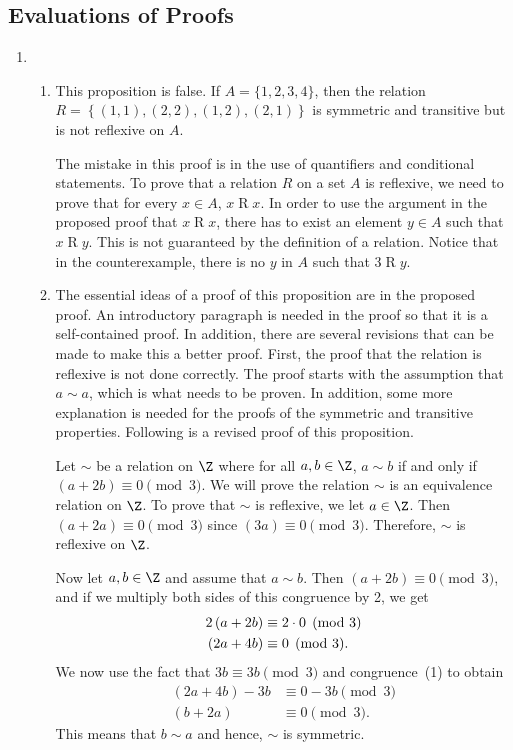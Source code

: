 \subsection*{Evaluations of Proofs}
\setcounter{oldenumi}{\theenumi}
\begin{enumerate} \setcounter{enumi}{\theoldenumi}
\item \begin{enumerate}
\item This proposition is false.  If $A = \{1, 2, 3, 4 \}$, then the relation  
$R  = \left\{ {\left( {1, 1} \right), \left( {2, 2} \right), \left( {1, 2} \right), \left( {2, 1} \right)} \right\}$ is symmetric and transitive but is not reflexive on  
$A$.

\noindent
The mistake in this proof is in the use of quantifiers and conditional statements.  To prove that a relation $R$ on a set $A$ is reflexive, we need to prove that for every $x \in A$, 
$x \mathrel{R} x$.  In order to use the argument in the proposed proof that $x \mathrel{R} x$, there has to exist an element $y \in A$ such that $x \mathrel{R} y$.  This is not guaranteed by the definition of a relation.  Notice that in the counterexample, there is no $y$ in $A$ such that $3 \mathrel{R} y$.

\item The essential ideas of a proof of this proposition are in the proposed proof.  An introductory paragraph is needed in the proof so that it is a self-contained proof.  In addition, there are several revisions that can be made to make this a better proof.  First, the proof that the relation is reflexive is not done correctly.  The proof starts with the assumption that $a \sim a$, which is what needs to be proven.  In addition, some more explanation is needed for the proofs of the symmetric and transitive properties.  Following is a revised proof of this proposition.

\setcounter{equation}{0}
\begin{myproof}
Let $\sim$ be a relation on $\Z$ where for all $a, b \in \Z$,  
$a \sim b$ if and only if $\left( a + 2b \right) \equiv 0 \pmod 3$.  We will prove the relation 
$\sim$ is an equivalence relation on $\Z$.  To prove that $\sim$ is reflexive, we let $a \in \Z$.
Then $\left( a + 2a \right) \equiv 0 \pmod 3$ since 
$\left( 3a \right) \equiv 0 \pmod 3$. Therefore, $\sim$ is reflexive on $\Z$.  

Now let $a, b \in \Z$ and assume that $a \sim b$.  Then 
$\left( a + 2b \right) \equiv 0 \pmod 3$, and if we multiply both sides of this congruence by 2, we get
\begin{align}
2\left( a + 2b \right) &\equiv 2 \cdot 0 \pmod 3 \notag \\
\left( 2a + 4b \right) &\equiv 0 \pmod 3.
\end{align}
We now use the fact that $3b \equiv 3b \pmod 3$ and congruence~(1) to obtain
\begin{align*}
\left( 2a + 4b \right) - 3b  &\equiv 0 - 3b \pmod 3  \\
\left( b + 2a \right) &\equiv 0 \pmod 3. 
\end{align*}
This means that $b \sim a$ and hence, $\sim$ is symmetric.


\end{myproof}
\end{enumerate}
\end{enumerate}
